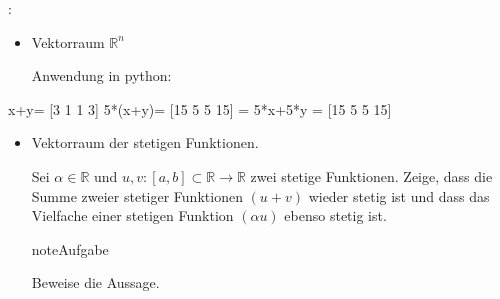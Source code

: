 \documentclass[letterpaper,10pt,english]{jupyterBook}
\begin{document}
:
\begin{itemize}
\item {} 
Vektorraum \(\mathbb{R}^n\)

Anwendung in python:

\end{itemize}

\begin{sphinxVerbatim}[commandchars=\\\{\}]
   
  \PYG{p}{[}\PYG{p}{]}
  \PYG{p}{[}\PYG{p}{]}

\end{sphinxVerbatim}

\begin{sphinxVerbatim}[commandchars=\\\{\}]
x+y= [\PYGZhy{}3 \PYGZhy{}1  1  3]
5*(x+y)= [\PYGZhy{}15  \PYGZhy{}5   5  15] = 5*x+5*y =  [\PYGZhy{}15  \PYGZhy{}5   5  15]
\end{sphinxVerbatim}
\begin{itemize}
\item {} 
Vektorraum der stetigen Funktionen.

Sei \(\alpha \in \mathbb{R}\) und \(u,v : [a,b]\subset \mathbb{R} \to \mathbb{R}\) zwei stetige Funktionen. Zeige, dass die Summe zweier stetiger Funktionen \((u+v)\) wieder stetig ist und dass das Vielfache einer stetigen Funktion \((\alpha u)\) ebenso stetig ist.

\begin{sphinxadmonition}{note}{Aufgabe}

Beweise die Aussage.
\end{sphinxadmonition}

\end{itemize}
\end{document}
